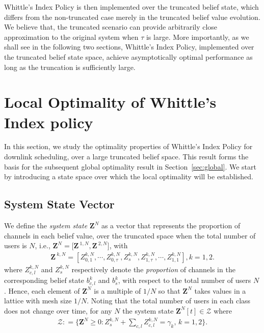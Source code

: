\documentclass[11pt,twocolumn]{IEEEtran}
\begin{document}
Whittle's Index Policy is then implemented over the truncated
belief state, which differs from the non-truncated case merely in
the truncated belief value evolution. We believe that, the truncated
scenario can provide arbitrarily close approximation to the original
system when $\tau$ is large. More importantly, as we shall see in
the following two sections, Whittle's Index Policy, implemented
over the truncated belief state space, achieve asymptotically
optimal performance as long as the truncation is sufficiently large.

\section{Local Optimality of Whittle's Index policy}
\label{sec:local}

In this section, we study the optimality properties of Whittle's
Index Policy for downlink scheduling, over a large truncated belief
space. This result forms the basis for the subsequent global
optimality result in Section~\ref{sec:global}. We start by introducing a state
space over which the local optimality will be established.

\subsection{System State Vector}
\label{sec:local:Z}

We define the \emph{system state} $\bm {\bm Z}^N$ as a vector
that represents the proportion of channels in each belief value, over
the truncated space when the total number of users is $N$, i.e.,
${\bm Z}^N=\big[{\bm Z}^{\>1,N}, {\bm Z}^{\>2,N}\big]$,
with
\begin{align}
\nonumber {\bm Z}^{\>k,N}{=}[ Z_{0,1}^{k,N},{\cdots},
Z_{0,\tau}^{k,N}, Z_{s}^{k,N}, Z_{1,\tau}^{k,N},{\cdots},Z_{1,1}^{k,N} ], k{=}1,2.
\end{align}
where $Z^{k,N}_{c,l}$ and $Z^{k,N}_{s}$ respectively denote the
\emph{proportion} of channels in the corresponding belief state
$b^k_{c,l}$ and $b^k_{s}$, with respect to the total number of users
$N$. Hence, each element of ${\bm Z}^N$ is a multiple of $1/N$
so that ${\bm Z}^N$ takes values in a lattice with mesh size
$1/N$. Noting that the total number of users in each class does not
change over time, for any $N$ the system state ${\bm Z}^N[t] \in
\mathcal{Z}$ where
\begin{align}
\mathcal{Z}:{=}\{{\bm Z}^N \geq 0: Z^{k,N}_{s}{+}\sum_{c,l}
Z^{k,N}_{c,l}{=}\gamma_k, \hspace{2pt} k{=}1,2 \}. \label{eq:beta}
\end{align}
\end{document}
